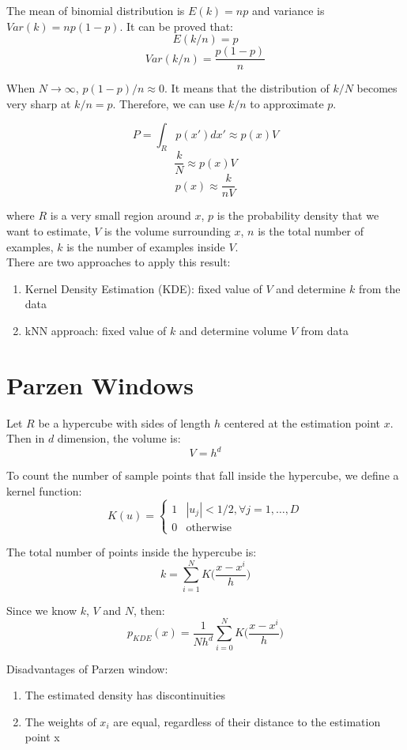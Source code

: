 \begin{multicols}{2}
\noindent The mean of binomial distribution is $E(k)=np$ and variance is $Var(k)=np(1-p)$. It can be proved that:
$$E(k / n) = p$$
$$Var(k / n) = \frac{p(1-p)}{n}$$

\noindent When $N\rightarrow \infty$, $p(1-p)/n \approx 0$. It means that the distribution of $k/N$ becomes very sharp at $k/n=p$. Therefore, we can use $k/n$ to approximate $p$.

$$P = \int_R p(x') dx' \approx p(x) V$$
$$\frac{k}{N} \approx p(x) V$$
$$p(x) \approx \frac{k}{nV}$$

\noindent where $R$ is a very small region around $x$, $p$ is the probability density that we want to estimate, $V$ is the volume surrounding $x$, $n$ is the total number of examples, $k$ is the number of examples inside $V$.\\

\noindent There are two approaches to apply this result:
\begin{enumerate}
    \item Kernel Density Estimation (KDE): fixed value of $V$ and determine $k$ from the data
    \item kNN approach: fixed value of $k$ and determine volume $V$ from data
\end{enumerate}

\section{Parzen Windows}

\noindent Let $R$ be a hypercube with sides of length $h$ centered at the estimation point $x$. Then in $d$ dimension, the volume is:
$$V=h^d$$

\noindent To count the number of sample points that fall inside the hypercube, we define a kernel function:
$$K(u) = 
\begin{cases}
1 & |u_j| < 1/2, \forall j=1,\ldots,D \\
0 & \text{otherwise}
\end{cases}
$$

\noindent The total number of points inside the hypercube is:
$$k= \sum_{i=1}^{N} K\Big( \frac{x-x^i}{h}\Big)$$

\noindent Since we know $k$, $V$ and $N$, then:
$$p_{KDE}(x) = \frac{1}{Nh^d} \sum_{i=0}^N K \Big( \frac{x-x^i}{h}\Big)$$

\noindent Disadvantages of Parzen window:
\begin{enumerate}
    \item The estimated density has discontinuities
    \item The weights of $x_i$ are equal, regardless of their distance to the estimation point x 
\end{enumerate}


\end{multicols}
